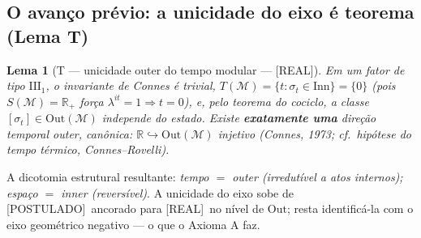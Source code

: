 \documentclass[11pt,a4paper]{article}
\newcommand{\REAL}{\textsf{[REAL]}}
\newcommand{\POST}{\textsf{[POSTULADO]}}
\newtheorem{lemma}{Lema}
\begin{document}
\subsection{O avanço prévio: a unicidade do eixo é teorema (Lema T)}
\begin{lemma}[T --- unicidade outer do tempo modular --- \REAL]
\label{lem:T}
Em um fator de tipo $\mathrm{III}_1$, o invariante de Connes é trivial,
$T(\mathcal M)=\{t:\sigma_t\in\mathrm{Inn}\}=\{0\}$ (pois
$S(\mathcal M)=\mathbb R_+$ força $\lambda^{it}=1\Rightarrow t=0$), e,
pelo teorema do cociclo, a classe $[\sigma_t]\in\mathrm{Out}(\mathcal M)$
independe do estado. Existe \textbf{exatamente uma} direção temporal
outer, canônica: $\mathbb R\hookrightarrow\mathrm{Out}(\mathcal M)$
injetivo (Connes, 1973; cf.\ hipótese do tempo térmico,
Connes--Rovelli).
\end{lemma}
\noindent A dicotomia estrutural resultante:
\emph{tempo $=$ outer (irredutível a atos internos); espaço $=$ inner
(reversível)}. A unicidade do eixo sobe de \POST\ ancorado para \REAL\ no
nível de $\mathrm{Out}$; resta identificá-la com o eixo geométrico
negativo --- o que o Axioma A faz.
\end{document}
